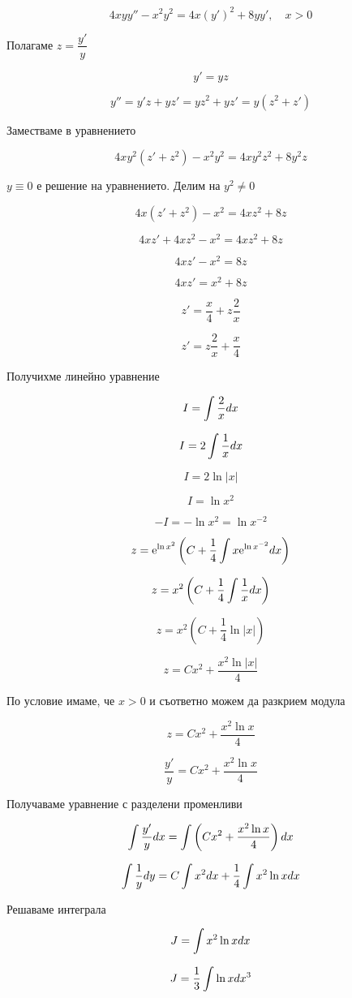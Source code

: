 \documentclass{scrartcl}
\begin{document}
$$4xyy'' - x^2y^2 = 4x(y')^2 + 8yy',\quad x>0$$

Полагаме $z = \dfrac{y'}{y}$

$$y' = yz$$

$$y'' = y'z+yz'=yz^2+yz'=y(z^2+z')$$

Заместваме в уравнението

$$4xy^2(z'+z^2) - x^2y^2 = 4xy^2z^2 + 8y^2z$$

$y\equiv 0$ е решение на уравнението. Делим на $y^2\ne 0$

$$4x(z'+z^2) - x^2 = 4xz^2 + 8z$$

$$4xz' + 4xz^2 - x^2 = 4xz^2 + 8z$$

$$4xz' - x^2 = 8z$$

$$4xz' = x^2 + 8z$$

$$z' = \dfrac{x}{4} + z\dfrac{2}{x}$$

$$z' = z\dfrac{2}{x}+\dfrac{x}{4}$$

Получихме линейно уравнение

$$I = \int \dfrac{2}{x}\space dx$$

$$I = 2\int \dfrac{1}{x}\space dx$$

$$I = 2\ln{|x|}$$

$$I = \ln{x^2}$$

$$-I = -\ln{x^2} = \ln{x^{-2}}$$

$$z = \mathrm{e}^{\ln{x^2}}\left(C+\dfrac{1}{4}\int x\mathrm{e}^{\ln{x^{-2}}}\space dx\right)$$

$$z = x^2\left(C+\dfrac{1}{4}\int \dfrac{1}{x}\space dx\right)$$

$$z = x^2\left(C + \frac{1}{4}\ln{|x|}\right)$$

$$z = Cx^2+\dfrac{x^2\ln{|x|}}{4}$$

По условие имаме, че $x>0$ и съответно можем да разкрием модула

$$z = Cx^2+\dfrac{x^2\ln{x}}{4}$$

$$\dfrac{y'}{y} = Cx^2+\dfrac{x^2\ln{x}}{4}$$

Получаваме уравнение с разделени променливи

$$\int \dfrac{y'}{y}\space dx = \int \left(Cx^2+\dfrac{x^2\ln{x}}{4}\right)\space dx$$

$$\int \dfrac{1}{y}\space dy = C\int x^2\space dx+\dfrac{1}{4}\int x^2\ln{x}\space dx$$

Решаваме интеграла

$$J = \int x^2\ln{x}\space dx$$

$$J = \dfrac{1}{3}\int \ln{x}\space dx^3$$
\end{document}
